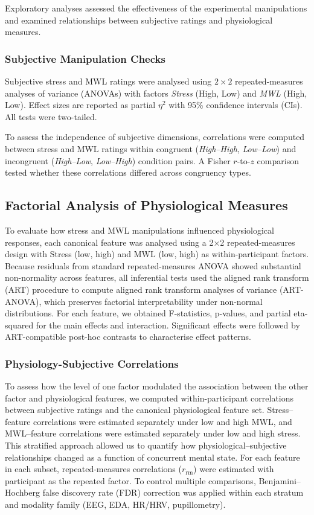 \documentclass[lettersize,journal]{IEEEtran}
\begin{document}
Exploratory analyses assessed the effectiveness of the experimental manipulations and examined relationships between subjective ratings and physiological measures.

\subsubsection{Subjective Manipulation Checks}
Subjective stress and MWL ratings were analysed using $2\times2$ repeated-measures analyses of variance (ANOVAs) with factors \textit{Stress} (High, Low) and \textit{MWL} (High, Low). Effect sizes are reported as partial $\eta^2$ with 95\% confidence intervals (CIs). 
All tests were two-tailed. 

To assess the independence of subjective dimensions, correlations were computed between stress and MWL ratings within congruent (\textit{High–High}, \textit{Low–Low}) and incongruent (\textit{High–Low}, \textit{Low–High}) condition pairs. 
A Fisher \(r\)-to-\(z\) comparison tested whether these correlations differed across congruency types.

\subsection{Factorial Analysis of Physiological Measures}

To evaluate how stress and MWL manipulations influenced physiological responses, each canonical feature was analysed using a 2×2 repeated-measures design with Stress (low, high) and MWL (low, high) as within-participant factors. Because residuals from standard repeated-measures ANOVA showed substantial non-normality across features, all inferential tests used the aligned rank transform (ART) procedure to compute aligned rank transform analyses of variance (ART-ANOVA), which preserves factorial interpretability under non-normal distributions. For each feature, we obtained F-statistics, p-values, and partial eta-squared for the main effects and interaction. Significant effects were followed by ART-compatible post-hoc contrasts to characterise effect patterns.


\subsubsection{Physiology-Subjective Correlations}

To assess how the level of one factor modulated the association between the other factor and physiological features, we computed within-participant correlations between subjective ratings and the canonical physiological feature set. Stress–feature correlations were estimated separately under low and high MWL, and MWL–feature correlations were estimated separately under low and high stress. This stratified approach allowed us to quantify how physiological–subjective relationships changed as a function of concurrent mental state. For each feature in each subset, repeated-measures correlations ($r_{\mathrm{rm}}$) were estimated with participant as the repeated factor. To control multiple comparisons, Benjamini–Hochberg false discovery rate (FDR) correction was applied within each stratum and modality family (EEG, EDA, HR/HRV, pupillometry).
\end{document}
